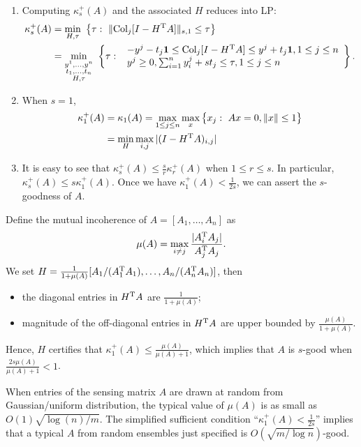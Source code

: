 \begin{remark}
\begin{enumerate}
\item
Computing $\kappa_s^+(A)$ and the associated $H$ reduces into LP:
\begin{align*}
\kappa_s^+(A)&=\min_{H,\tau}~\big\{
\tau:~\|\text{Col}_j[I - H^{\mathrm T} A]\|_{s,1}\le\tau
\big\}\\
&=\min_{\substack{y^1,\ldots,y^n\\
t_1,\ldots,t_n\\
H,\tau}}~\left\{
\tau:~
\begin{array}{l}
-y^j-t_j\bm 1\le \text{Col}_j[I - H^{\mathrm T} A]\le y^j + t_j\bm 1, 1\le j\le n\\
y^j\ge0, \sum_{i=1}^ny_i^j + st_j\le\tau, 1\le j\le n
\end{array}
\right\}.
\end{align*}
\item
When $s=1$, 
\begin{align*}
\kappa_1^+(A)&=\kappa_1(A)=
\max_{1\le j\le n}\max_x\big\{
x_j:~Ax=0, \|x\|\le 1
\big\}\\&=\min_{H}\max_{i,j}|(I-H^{\mathrm T} A)_{i,j}|
\end{align*}
\item
It is easy to see that $\kappa_s^+(A)\le \frac{s}{r}\kappa_r^+(A)$ when $1\le r\le s$.
In particular, $\kappa_s^+(A)\le s\kappa_1^+(A)$.
Once we have $\kappa_1^+(A)<\frac{1}{2s}$, we can assert the $s$-goodness of $A$.
\end{enumerate}
\end{remark}
Define the mutual incoherence of $A=[A_1,\ldots,A_n]$ as
\[
\mu(A)=\max_{i\ne j}\frac{|A_i^{\mathrm T} A_j|}{A_j^{\mathrm T} A_j}.
\]
We set $H=\frac{1}{1+\mu(A)}[A_1/(A_1^{\mathrm T} A_1),\ldots,A_n/(A_n^{\mathrm T} A_n)]$, then
\begin{itemize}
\item
the diagonal entries in $H^{\mathrm T} A$ are $\frac{1}{1+\mu(A)}$;
\item
magnitude of the off-diagonal entries in $H^{\mathrm T} A$ are upper bounded by $\frac{\mu(A)}{1+\mu(A)}$.
\end{itemize}
Hence, $H$ certifies that $\kappa_1^+(A)\le\frac{\mu(A)}{\mu(A)+1}$, which implies that $A$ is $s$-good when $\frac{2s\mu(A)}{\mu(A)+1}<1$.
\begin{remark}
When entries of the sensing matrix $A$ are drawn at random from Gaussian/uniform distribution,
the typical value of $\mu(A)$ is as small as $O(1)\sqrt{\log(n)/m}$.
The simplified sufficient condition ``$\kappa_1^+(A)<\frac{1}{2s}$'' implies that a typical $A$ from random ensembles just specified is $O(\sqrt{m/\log n})$-good.
\end{remark}
